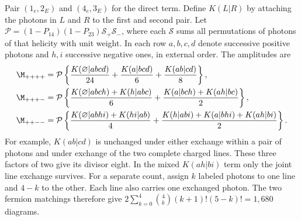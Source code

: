 Pair $(1_e,2_E)$ and $(4_e,3_E)$ for the direct term. Define $K(L|R)$
by attaching the photons in $L$ and $R$ to the first and second pair.
Let $\mathcal P=(1-P_{14})(1-P_{23})\mathcal S_+\mathcal S_-$,
where each $\mathcal S$ sums all permutations of photons of that helicity
with unit weight. In each row $a,b,c,d$ denote successive positive
photons and $h,i$ successive negative ones, in external order. The
amplitudes are
\begin{align}
 \M_{++++} &= \mathcal P\left\{
  \frac{K(\varnothing|abcd)}{24}+\frac{K(a|bcd)}6+\frac{K(ab|cd)}8\right\},\nonumber\\
 \M_{+++-} &= \mathcal P\left\{
  \frac{K(\varnothing|abch)+K(h|abc)}6
   +\frac{K(a|bch)+K(ah|bc)}2\right\},\nonumber\\
 \M_{++--} &= \mathcal P\left\{
  \frac{K(\varnothing|abhi)+K(hi|ab)}4
  +\frac{K(h|abi)+K(a|bhi)+K(ah|bi)}2\right\}.
 \label{eq:eight-four-fermions}
\end{align}
For example, $K(ab|cd)$ is unchanged under either exchange within a
pair of photons and under exchange of the two complete charged lines.
These three factors of two give its divisor eight. In the mixed
$K(ah|bi)$ term only the joint line exchange survives. For a separate
count, assign $k$ labeled photons to one line and $4-k$ to the other.
Each line also carries one exchanged photon. The two fermion matchings
therefore give
$2\sum_{k=0}^4\binom4k(k+1)!(5-k)!=1{,}680$ diagrams.

